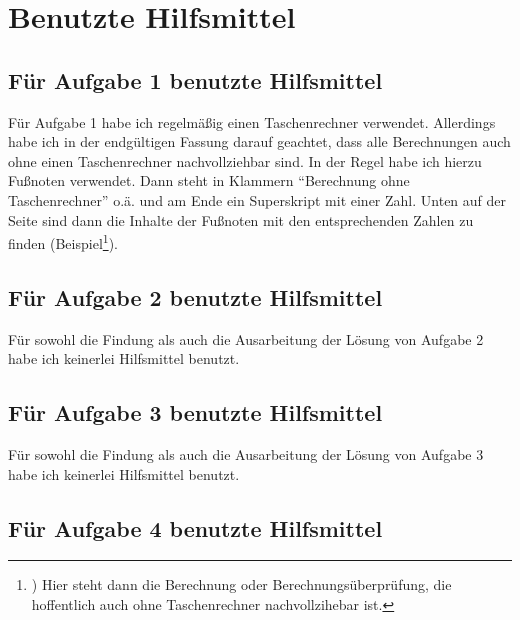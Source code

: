 \section{Benutzte Hilfsmittel}

\subsection*{Für Aufgabe 1 benutzte Hilfsmittel}

Für Aufgabe 1 habe ich regelmäßig einen Taschenrechner verwendet. Allerdings habe ich in der endgültigen Fassung 
darauf geachtet, dass alle Berechnungen auch ohne einen Taschenrechner nachvollziehbar sind. In der Regel habe 
ich hierzu Fußnoten verwendet. Dann steht in Klammern "`Berechnung ohne Taschenrechner"' o.ä. und am Ende ein 
Superskript mit einer Zahl. Unten auf der Seite sind dann die Inhalte der Fußnoten mit  den entsprechenden Zahlen 
zu finden (Beispiel\footnote{) Hier steht dann die Berechnung oder Berechnungsüberprüfung, die hoffentlich auch ohne 
Taschenrechner nachvollzihebar ist.}).


\subsection*{Für Aufgabe 2 benutzte Hilfsmittel}

Für sowohl die Findung als auch die Ausarbeitung der Lösung von Aufgabe 2 habe ich keinerlei Hilfsmittel benutzt.

\subsection*{Für Aufgabe 3 benutzte Hilfsmittel}

Für sowohl die Findung als auch die Ausarbeitung der Lösung von Aufgabe 3 habe ich keinerlei Hilfsmittel benutzt.

\subsection*{Für Aufgabe 4 benutzte Hilfsmittel}

